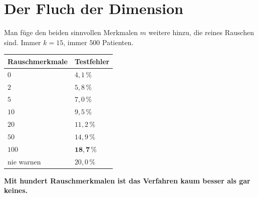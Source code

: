 \section{Der Fluch der Dimension}

\begin{warnung}
Man füge den beiden sinnvollen Merkmalen $m$ weitere hinzu, die reines Rauschen sind. Immer $k = 15$, immer $500$ Patienten.

\begin{center}
{\small
\renewcommand{\arraystretch}{1.46}
\begin{tabular}{@{}P{2.8cm}P{2.4cm}@{}}
\toprule
\textbf{Rauschmerkmale} & \textbf{Testfehler}\\
\midrule
$0$ & $4{,}1\,\%$\\
$2$ & $5{,}8\,\%$\\
$5$ & $7{,}0\,\%$\\
$10$ & $9{,}5\,\%$\\
$20$ & $11{,}2\,\%$\\
$50$ & $14{,}9\,\%$\\
$100$ & $\mathbf{18{,}7\,\%}$\\
\midrule
nie warnen & $20{,}0\,\%$\\
\bottomrule
\end{tabular}}
\end{center}

\begin{center}
\begin{minipage}{0.9\textwidth}
\textbf{Mit hundert Rauschmerkmalen ist das Verfahren kaum besser als gar keines.}
\end{minipage}
\end{center}

\begin{center}
\begin{minipage}{0.88\textwidth}
\end{minipage}
\end{center}
\end{warnung}

